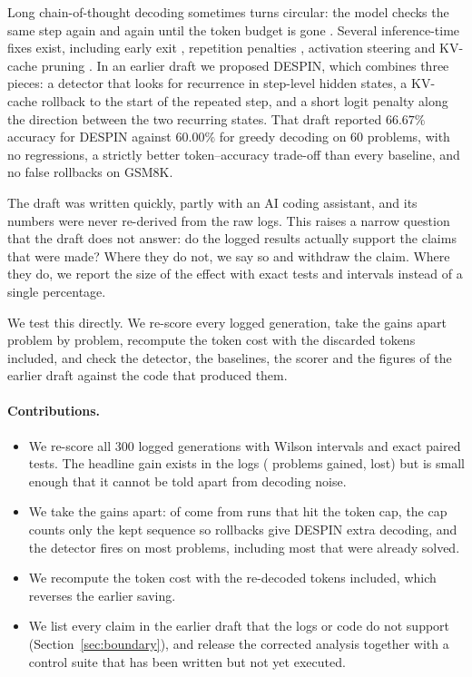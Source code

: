 \documentclass[11pt]{article}
\begin{document}
Long chain-of-thought decoding \citep{snell2024scaling,deepseek2025r1} sometimes turns circular: the model checks the same step again and again until the token budget is gone \citep{duan2026circular}. Several inference-time fixes exist, including early exit \citep{wei2025stop}, repetition penalties \citep{keskar2019ctrl}, activation steering \citep{huang2025manifold} and KV-cache pruning \citep{xu2026loopguard}. In an earlier draft we proposed DESPIN, which combines three pieces: a detector that looks for recurrence in step-level hidden states, a KV-cache rollback to the start of the repeated step, and a short logit penalty along the direction between the two recurring states. That draft reported $66.67\%$ accuracy for DESPIN against $60.00\%$ for greedy decoding on 60 problems, with no regressions, a strictly better token--accuracy trade-off than every baseline, and no false rollbacks on GSM8K.

The draft was written quickly, partly with an AI coding assistant, and its numbers were never re-derived from the raw logs. This raises a narrow question that the draft does not answer: do the logged results actually support the claims that were made? Where they do not, we say so and withdraw the claim. Where they do, we report the size of the effect with exact tests and intervals instead of a single percentage.

We test this directly. We re-score every logged generation, take the gains apart problem by problem, recompute the token cost with the discarded tokens included, and check the detector, the baselines, the scorer and the figures of the earlier draft against the code that produced them.

\paragraph{Contributions.}
\begin{itemize}
  \item We re-score all 300 logged generations with Wilson intervals and exact paired tests. The headline gain exists in the logs (\statNDespinVsGreedyOnlyMethod{} problems gained, \statNDespinVsGreedyOnlyGreedy{} lost) but is small enough that it cannot be told apart from decoding noise.
  \item We take the gains apart: \statRescueCapped{} of \statRescueCount{} come from runs that hit the token cap, the cap counts only the kept sequence so rollbacks give DESPIN extra decoding, and the detector fires on most problems, including most that were already solved.
  \item We recompute the token cost with the re-decoded tokens included, which reverses the earlier saving.
  \item We list every claim in the earlier draft that the logs or code do not support (Section~\ref{sec:boundary}), and release the corrected analysis together with a control suite that has been written but not yet executed.
\end{itemize}
\end{document}
